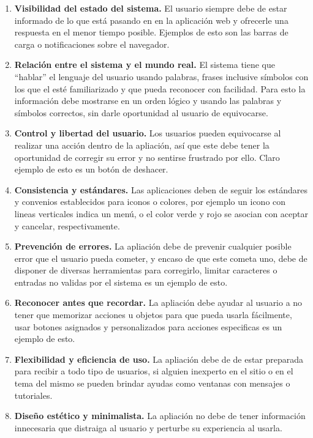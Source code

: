 \begin{enumerate}
	\item \textbf{Visibilidad del estado del sistema.} El usuario siempre debe de estar informado de lo que está pasando en en la aplicación web y ofrecerle una respuesta en el menor tiempo posible. Ejemplos de esto son las barras de carga o notificaciones sobre el navegador.
	
	\item \textbf{Relación entre el sistema y el mundo real.} El sistema tiene que “hablar” el lenguaje del usuario usando palabras, frases inclusive símbolos con los que el esté familiarizado y que pueda reconocer con facilidad. Para esto la información debe mostrarse en un orden lógico y usando las palabras y símbolos correctos, sin darle oportunidad al usuario de equivocarse.
	\item \textbf{Control y libertad del usuario.} Los usuarios pueden equivocarse al realizar una acción dentro de la apliación, así que este debe tener la oportunidad de corregir su error y no sentirse frustrado por ello. Claro ejemplo de esto es un botón de deshacer.
	
	\item \textbf{Consistencia y estándares.} Las aplicaciones deben de seguir los estándares y convenios establecidos para iconos o colores, por ejemplo un icono con lineas verticales indica un menú, o el color verde y rojo se asocian con aceptar y cancelar, respectivamente.
	
	\item \textbf{Prevención de errores.} La apliación debe de prevenir cualquier posible error que el usuario pueda cometer, y encaso de que este cometa uno, debe de disponer de diversas herramientas para corregirlo, limitar caracteres o entradas no validas por el sistema es un ejemplo de esto.
	
	\item \textbf{Reconocer antes que recordar.} La apliación debe ayudar al usuario a no tener que memorizar acciones u objetos para que pueda usarla fácilmente, usar botones asignados y personalizados para acciones especificas es un ejemplo de esto.
	 
	\item \textbf{Flexibilidad y eficiencia de uso.} La apliación debe de de estar preparada para recibir a todo tipo de usuarios, si alguien inexperto en el sitio o en el tema del mismo se pueden brindar ayudas como ventanas con mensajes o tutoriales. 
	
	\item \textbf{Diseño estético y minimalista.} La apliación no debe de tener información innecesaria que distraiga al usuario y perturbe su experiencia al usarla.
	

\end{enumerate}
